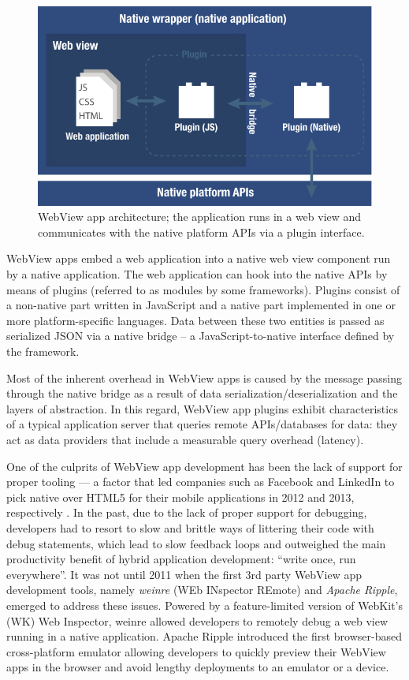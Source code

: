 \documentclass[thesis.tex]{subfiles}
\begin{document}
\begin{figure}[ht]
\centering \includegraphics[width=\textwidth]{images/web-view-app-structure}
\caption{WebView app architecture; the application runs in a web view and communicates with the native platform APIs via a plugin interface.\label{fig:web-view-app}}
\end{figure}

WebView apps embed a web application into a native web view component run by a native application. The web application can hook into the native APIs by means of plugins (referred to as modules by some frameworks). Plugins consist of a non-native part written in JavaScript and a native part implemented in one or more platform-specific languages. Data between these two entities is passed as serialized JSON via a native bridge -- a JavaScript-to-native interface defined by the framework.

Most of the inherent overhead in WebView apps is caused by the message passing through the native bridge as a result of data serialization/deserialization and the layers of abstraction. In this regard, WebView app plugins exhibit characteristics of a typical application server that queries remote APIs/databases for data: they act as data providers that include a measurable query overhead (latency).

One of the culprits of WebView app development has been the lack of support for proper tooling --- a factor that led companies such as Facebook and LinkedIn to pick native over HTML5 for their mobile applications in 2012 and 2013, respectively \cite{html_vs_native_facebook}\cite{html_vs_native_linkedin}. In the past, due to the lack of proper support for debugging, developers had to resort to slow and brittle ways of littering their code with debug statements, which lead to slow feedback loops and outweighed the main productivity benefit of hybrid application development: ``write once, run everywhere''. It was not until 2011 when the first 3rd party WebView app development tools, namely \textit{weinre} (WEb INspector REmote) and \textit{Apache Ripple}, emerged to address these issues. Powered by a feature-limited version of WebKit's (WK) Web Inspector, weinre allowed developers to remotely debug a web view running in a native application. Apache Ripple introduced the first browser-based cross-platform emulator allowing developers to quickly preview their WebView apps in the browser and avoid lengthy deployments to an emulator or a device.
\end{document}
